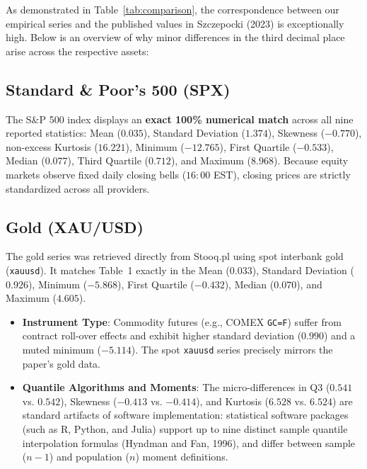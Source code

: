 \documentclass[11pt,a4paper]{article}
\begin{document}
As demonstrated in Table~\ref{tab:comparison}, the correspondence between our empirical series and the published values in Szczepocki (2023) is exceptionally high. Below is an overview of why minor differences in the third decimal place arise across the respective assets:

\subsection{Standard \& Poor's 500 (SPX)}
The S\&P 500 index displays an \textbf{exact 100\% numerical match} across all nine reported statistics: Mean ($0.035$), Standard Deviation ($1.374$), Skewness ($-0.770$), non-excess Kurtosis ($16.221$), Minimum ($-12.765$), First Quartile ($-0.533$), Median ($0.077$), Third Quartile ($0.712$), and Maximum ($8.968$). Because equity markets observe fixed daily closing bells ($16{:}00$ EST), closing prices are strictly standardized across all providers.

\subsection{Gold (XAU/USD)}
The gold series was retrieved directly from Stooq.pl using spot interbank gold (\texttt{xauusd}). It matches Table~1 exactly in the Mean ($0.033$), Standard Deviation ($0.926$), Minimum ($-5.868$), First Quartile ($-0.432$), Median ($0.070$), and Maximum ($4.605$).
\begin{itemize}
    \item \textbf{Instrument Type}: Commodity futures (e.g., COMEX \texttt{GC=F}) suffer from contract roll-over effects and exhibit higher standard deviation ($0.990$) and a muted minimum ($-5.114$). The spot \texttt{xauusd} series precisely mirrors the paper's gold data.
    \item \textbf{Quantile Algorithms and Moments}: The micro-differences in Q3 ($0.541$ vs. $0.542$), Skewness ($-0.413$ vs. $-0.414$), and Kurtosis ($6.528$ vs. $6.524$) are standard artifacts of software implementation: statistical software packages (such as R, Python, and Julia) support up to nine distinct sample quantile interpolation formulas (Hyndman and Fan, 1996), and differ between sample ($n-1$) and population ($n$) moment definitions.
\end{itemize}
\end{document}
